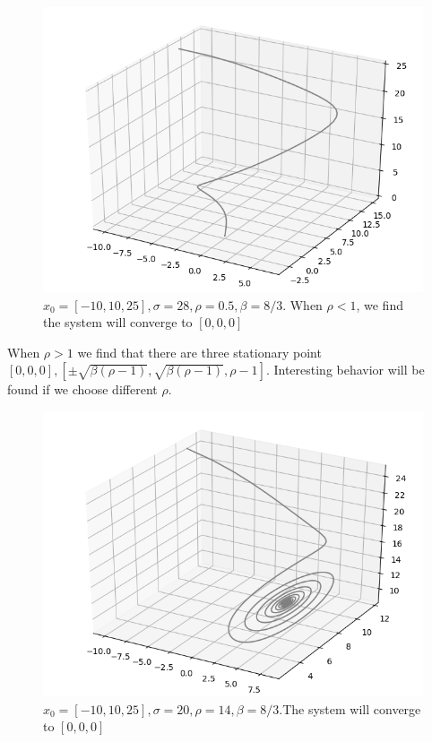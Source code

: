 \documentclass{article}
\begin{document}
\begin{figure}[H]
	\centering
	\caption{$x_0 = [-10,10,25], \sigma = 28, \rho = 0.5, \beta = 8/3$. When $\rho<1$, we find the system will converge to $[0,0,0]$}
	\includegraphics[scale=0.5]{../5.png}
\end{figure}
When $\rho>1$ we find that there are three stationary point $[0,0,0], [\pm\sqrt{\beta(\rho-1)},\sqrt{\beta(\rho-1)},\rho-1]$. Interesting behavior will be found if we choose different $\rho$. 
\begin{figure}[H]
	\centering
	\caption{$x_0 = [-10,10,25], \sigma = 20, \rho = 14, \beta = 8/3$.The system will converge to $[0,0,0]$}
	\includegraphics[scale=0.5]{../6.png}
\end{figure}
\end{document}
